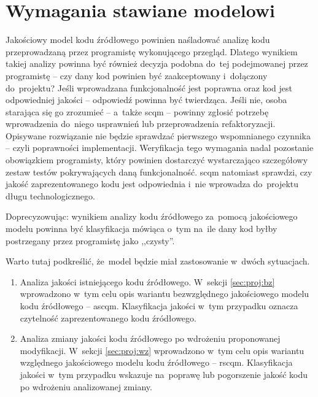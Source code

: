 \documentclass[twoside]{praca}
\begin{document}
\section{Wymagania stawiane modelowi}
\label{sec:proj:requirements}


Jakościowy model kodu źródłowego powinien naśladować analizę kodu przeprowadzaną przez programistę wykonującego przegląd. Dlatego wynikiem takiej analizy powinna być również decyzja podobna do~tej podejmowanej przez programistę -- czy dany kod powinien być zaakceptowany i~dołączony do~projektu? Jeśli wprowadzana funkcjonalność jest poprawna oraz kod jest odpowiedniej jakości -- odpowiedź powinna być twierdząca. Jeśli nie, osoba starająca się go zrozumieć -- a~także \gls{scqm} -- powinny zgłosić potrzebę wprowadzenia do~niego usprawnień lub przeprowadzenia refaktoryzacji. Opisywane rozwiązanie nie będzie sprawdzać pierwszego wspomnianego czynnika -- czyli poprawności implementacji. Weryfikacja tego wymagania nadal pozostanie obowiązkiem programisty, który powinien dostarczyć wystarczająco szczegółowy zestaw testów pokrywających daną funkcjonalność. \gls{scqm} natomiast sprawdzi, czy jakość zaprezentowanego kodu jest odpowiednia i~nie wprowadza do~projektu długu technologicznego.

Doprecyzowując: wynikiem analizy kodu źródłowego za~pomocą jakościowego modelu powinna być klasyfikacja mówiąca o~tym na~ile dany kod byłby postrzegany przez programistę jako ,,czysty''.

Warto tutaj podkreślić, że~model będzie miał zastosowanie w~dwóch sytuacjach. 

\begin{enumerate}
\item Analiza jakości istniejącego kodu źródłowego. W~sekcji \ref{sec:proj:bz} wprowadzono w~tym celu opis wariantu bezwzględnego jakościowego modelu kodu źródłowego -- \gls{ascqm}. Klasyfikacja jakości w~tym przypadku oznacza czytelność zaprezentowanego kodu źródłowego.
\item Analiza zmiany jakości kodu źródłowego po wdrożeniu proponowanej modyfikacji. W~sekcji \ref{sec:proj:wz} wprowadzono w~tym celu opis wariantu względnego jakościowego modelu kodu  źródłowego -- \gls{rscqm}. Klasyfikacja jakości w~tym przypadku wskazuje na~poprawę lub pogorszenie jakość kodu po wdrożeniu analizowanej zmiany.
\end{enumerate}
\end{document}
